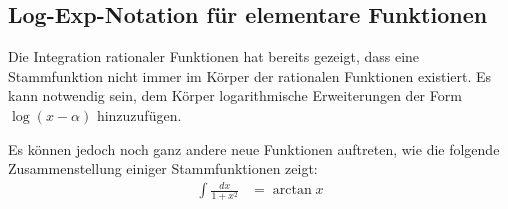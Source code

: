 %
%
%
\subsection{Log-Exp-Notation für elementare Funktionen
\label{buch:integral:subsection:logexp}}
Die Integration rationaler Funktionen hat bereits gezeigt, dass
eine Stammfunktion nicht immer im Körper der rationalen Funktionen
existiert.
Es kann notwendig sein, dem Körper logarithmische Erweiterungen der Form
$\log(x-\alpha)$ hinzuzufügen.

Es können jedoch noch ganz andere neue Funktionen auftreten, wie die
folgende Zusammenstellung einiger Stammfunktionen zeigt:
\begin{align*}
\int\frac{dx}{1+x^2}
&=
\arctan x
\\
\end{align*}






